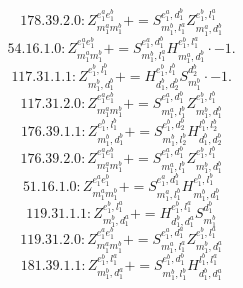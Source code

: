 \documentclass[letterpaper,10pt,fleqn,leqno,onecolumn]{article}
\begin{document}
\begin{equation} \;\;\;\;\;\;  178.39.2.0: Z^{e_{1}^{a}e_{1}^{b}}_{m_{1}^{a}m_{1}^{b}}+=S^{e_{1}^{a},d_{1}^{b}}_{m_{1}^{b},l_{1}^{a}}Z^{e_{1}^{b},l_{1}^{a}}_{m_{1}^{a},d_{1}^{b}} \end{equation}
\begin{equation} \;\;\;\;\;\;  54.16.1.0: Z^{e_{1}^{a}e_{1}^{b}}_{m_{1}^{a}m_{1}^{b}}+=S^{e_{1}^{a},d_{1}^{b}}_{m_{1}^{b},l_{1}^{a}}H^{e_{1}^{b},l_{1}^{a}}_{m_{1}^{a},d_{1}^{b}}\cdot -1. \end{equation}
\begin{equation} \;\;\;\;\;\;  117.31.1.1: Z^{e_{1}^{b},l_{1}^{b}}_{m_{1}^{b},d_{1}^{b}}+=H^{e_{1}^{b},l_{1}^{b}}_{d_{1}^{b},d_{2}^{b}}S^{d_{2}^{b}}_{m_{1}^{b}}\cdot -1. \end{equation}
\begin{equation} \;\;\;\;\;\;  117.31.2.0: Z^{e_{1}^{a}e_{1}^{b}}_{m_{1}^{a}m_{1}^{b}}+=S^{e_{1}^{a},d_{1}^{b}}_{m_{1}^{a},l_{1}^{b}}Z^{e_{1}^{b},l_{1}^{b}}_{m_{1}^{b},d_{1}^{b}} \end{equation}
\begin{equation} \;\;\;\;\;\;  176.39.1.1: Z^{e_{1}^{b},l_{1}^{b}}_{m_{1}^{b},d_{1}^{b}}+=S^{e_{1}^{b},d_{2}^{b}}_{m_{1}^{b},l_{2}^{b}}H^{l_{1}^{b},l_{2}^{b}}_{d_{1}^{b},d_{2}^{b}} \end{equation}
\begin{equation} \;\;\;\;\;\;  176.39.2.0: Z^{e_{1}^{a}e_{1}^{b}}_{m_{1}^{a}m_{1}^{b}}+=S^{e_{1}^{a},d_{1}^{b}}_{m_{1}^{a},l_{1}^{b}}Z^{e_{1}^{b},l_{1}^{b}}_{m_{1}^{b},d_{1}^{b}} \end{equation}
\begin{equation} \;\;\;\;\;\;  51.16.1.0: Z^{e_{1}^{a}e_{1}^{b}}_{m_{1}^{a}m_{1}^{b}}+=S^{e_{1}^{a},d_{1}^{b}}_{m_{1}^{a},l_{1}^{b}}H^{e_{1}^{b},l_{1}^{b}}_{m_{1}^{b},d_{1}^{b}} \end{equation}
\begin{equation} \;\;\;\;\;\;  119.31.1.1: Z^{e_{1}^{b},l_{1}^{a}}_{m_{1}^{b},d_{1}^{a}}+=H^{e_{1}^{b},l_{1}^{a}}_{d_{1}^{b},d_{1}^{a}}S^{d_{1}^{b}}_{m_{1}^{b}} \end{equation}
\begin{equation} \;\;\;\;\;\;  119.31.2.0: Z^{e_{1}^{a}e_{1}^{b}}_{m_{1}^{a}m_{1}^{b}}+=S^{e_{1}^{a},d_{1}^{a}}_{m_{1}^{a},l_{1}^{a}}Z^{e_{1}^{b},l_{1}^{a}}_{m_{1}^{b},d_{1}^{a}} \end{equation}
\begin{equation} \;\;\;\;\;\;  181.39.1.1: Z^{e_{1}^{b},l_{1}^{a}}_{m_{1}^{b},d_{1}^{a}}+=S^{e_{1}^{b},d_{1}^{b}}_{m_{1}^{b},l_{1}^{b}}H^{l_{1}^{b},l_{1}^{a}}_{d_{1}^{b},d_{1}^{a}} \end{equation}
\end{document}
